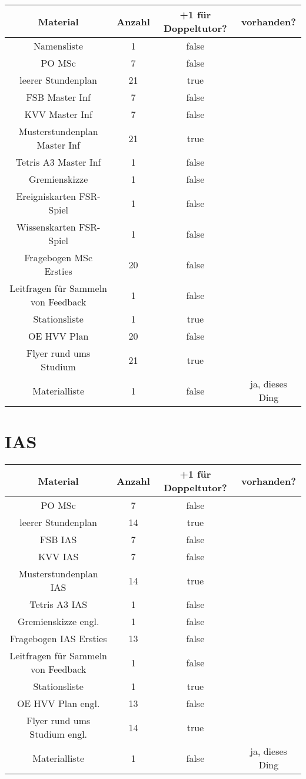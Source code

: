 \documentclass[10pt,a4paper,oneside,ngerman,numbers=noenddot]{scrartcl}
\begin{document}
	\begin{tabular}{c|c|c|c}
		\textbf{Material} & \textbf{Anzahl} & \textbf{+1 für Doppeltutor?} & \textbf{vorhanden?} \\
		\hline
		Namensliste & 1 & false & \\
		\hline
		PO MSc & 7 & false & \\
		\hline
		leerer Stundenplan & 21 & true & \\
		\hline
		FSB Master Inf & 7 & false & \\
		\hline
		KVV Master Inf & 7 & false & \\
		\hline
		Musterstundenplan Master Inf & 21 & true & \\
		\hline
		Tetris A3 Master Inf & 1 & false & \\
		\hline
		Gremienskizze & 1 & false & \\
		\hline
		Ereigniskarten FSR-Spiel & 1 & false & \\
		\hline
		Wissenskarten FSR-Spiel & 1 & false & \\
		\hline
		Fragebogen MSc Ersties & 20 & false & \\
		\hline
		Leitfragen für Sammeln von Feedback & 1 & false & \\
		\hline
		Stationsliste & 1 & true & \\
		\hline
		OE HVV Plan & 20 & false & \\
		\hline
		Flyer rund ums Studium & 21 & true & \\
		\hline
		Materialliste & 1 & false & ja, dieses Ding \\
	\end{tabular}

\section{IAS}

	\begin{tabular}{c|c|c|c}
		\textbf{Material} & \textbf{Anzahl} & \textbf{+1 für Doppeltutor?} & \textbf{vorhanden?} \\
		\hline
		PO MSc & 7 & false & \\
		\hline
		leerer Stundenplan & 14 & true & \\
		\hline
		FSB IAS & 7 & false & \\
		\hline
		KVV IAS & 7 & false & \\
		\hline
		Musterstundenplan IAS & 14 & true & \\
		\hline
		Tetris A3 IAS & 1 & false & \\
		\hline
		Gremienskizze engl. & 1 & false & \\
		\hline
		Fragebogen IAS Ersties & 13 & false & \\
		\hline
		Leitfragen für Sammeln von Feedback & 1 & false & \\
		\hline
		Stationsliste & 1 & true & \\
		\hline
		OE HVV Plan engl. & 13 & false & \\
		\hline
		Flyer rund ums Studium engl. & 14 & true & \\
		\hline
		Materialliste & 1 & false & ja, dieses Ding \\
	\end{tabular}
\end{document}
